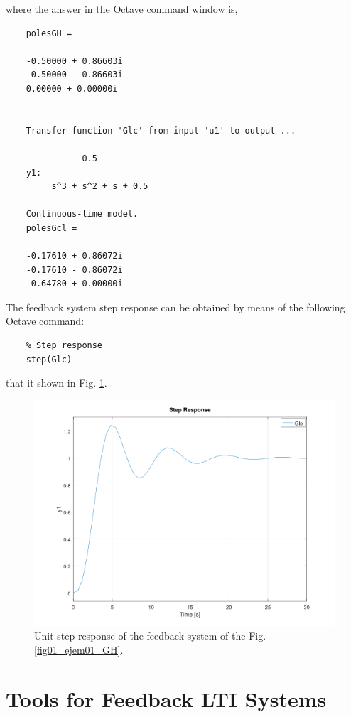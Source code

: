 where the answer in the Octave command window is,
\begin{verbatim}
	polesGH =
	
	-0.50000 + 0.86603i
	-0.50000 - 0.86603i
	0.00000 + 0.00000i
	
	
	Transfer function 'Glc' from input 'u1' to output ...
	
	           0.5
	y1:  -------------------
	     s^3 + s^2 + s + 0.5
	
	Continuous-time model.
	polesGcl =
	
	-0.17610 + 0.86072i
	-0.17610 - 0.86072i
	-0.64780 + 0.00000i
\end{verbatim}

The feedback system step response can be obtained by means of the following Octave command:
\begin{verbatim}
	% Step response
	step(Glc)
\end{verbatim}
that it shown in Fig. \ref{chp_lc_fig01_step_GH}.
\begin{figure}[H]
	\centering
	\includegraphics[scale=0.85]{./figuras/chapter_glc/fig01_step_lc.png}
	\caption{Unit step response of the feedback system of the Fig. \ref{fig01_ejem01_GH}.}
	\label{chp_lc_fig01_step_GH}
\end{figure}



\section{Tools for Feedback LTI Systems}

